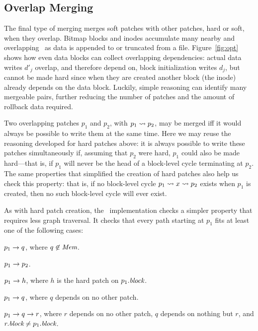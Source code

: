 \subsection{Overlap Merging}
\label{sec:chdescs:merge:overlap}

The final type of merging merges soft patches with other patches,
hard or soft, when they overlap.
%
Bitmap blocks and inodes accumulate many nearby and overlapping \chdescs\
as data is appended to or truncated from a file.
%
Figure~\ref{fig:opt} shows how even data blocks can collect overlapping
dependencies: actual data writes $d'_j$ overlap, and therefore depend on,
block initialization writes $d_j$, but cannot be made hard since when they
are created another block (the inode) already depends on the data block.
%
Luckily, simple reasoning can identify many mergeable pairs,
further reducing the number of patches and the amount of rollback data
required.


Two overlapping patches $p_1$ and $p_2$, with $p_1 \leadsto p_2$, may be
merged iff it would always be possible to write them at the same time.
%
Here we may reuse the reasoning developed for hard patches above: it is
always possible to write these patches simultaneously if, assuming that
$p_2$ were hard, $p_1$ could also be made hard---that is, if $p_1$ will
never be the head of a block-level cycle terminating at $p_2$.
%
The same properties that simplified the creation of hard patches also help
us check this property: that is, if no block-level cycle $p_1 \leadsto x
\leadsto p_2$ exists when $p_1$ is created, then no such block-level cycle
will ever exist.



As with hard patch creation, the \Kudos\ implementation checks a simpler
property that requires less graph traversal.
%
It checks that every path starting at $p_1$ fits at least one of the
following cases:

\begin{xcompactitemize}
\item $p_1 \rightarrow q$, where $q \not\in \PMem$.
\item $p_1 \rightarrow p_2$.
\item $p_1 \rightarrow h$, where $h$ is the hard patch on $p_1.\textit{block}$.
\item $p_1 \rightarrow q$, where $q$ depends on no other patch.
\item $p_1 \rightarrow q \rightarrow r$, where $r$ depends on no other patch,
  $q$ depends on nothing but $r$, and $r.\textit{block} \neq p_1.\textit{block}$.
\end{xcompactitemize}

